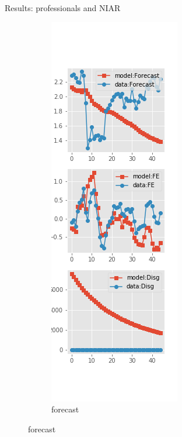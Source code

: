 \documentclass{beamer}
\begin{document}
\begin{frame}{Results: professionals and NIAR}
	\begin{figure}[ht]
		\label{NI_diag_SPF}
		\begin{subfigure}[b]{0.19\textwidth}
			\centering
			\caption{forecast}
			\includegraphics[width=\textwidth, height = 0.8\textheight]{figuresDraft/spf_ni_est_diag0.png}

\end{subfigure}
\end{figure}
\end{frame}
\end{document}
